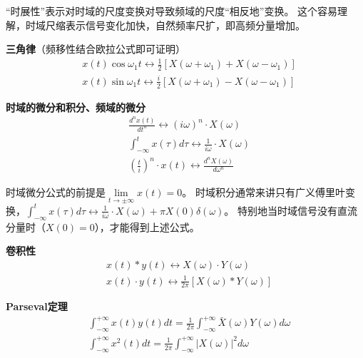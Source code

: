 “时展性”表示对时域的尺度变换对导致频域的尺度“相反地”变换。
这个容易理解，时域尺缩表示信号变化加快，自然频率尺扩，即高频分量增加。

{\bf 三角律}（频移性结合欧拉公式即可证明）
\begin{align*}
&x\left( t \right) \cos \omega _1t\leftrightarrow \frac{1}{2}\left[ X\left( \omega +\omega _1 \right) +X\left( \omega -\omega _1 \right) \right] \\
&x\left( t \right) \sin \omega _1t\leftrightarrow \frac{i}{2}\left[ X\left( \omega +\omega _1 \right) -X\left( \omega -\omega _1 \right) \right]
\end{align*}

{\bf 时域的微分和积分、频域的微分}
\begin{align*}
&\frac{d^nx\left( t \right)}{dt^n}\leftrightarrow \left( i\omega \right) ^n\cdot X\left( \omega \right) \\
&\int_{-\infty}^t{x\left( \tau \right) d\tau}\leftrightarrow \frac{1}{i\omega}\cdot X\left( \omega \right) \\
&\left( \frac{t}{i} \right) ^n\cdot x\left( t \right) \leftrightarrow \frac{d^nX\left( \omega \right)}{d\omega ^n}
\end{align*}

时域微分公式的前提是$\underset{t\rightarrow \pm \infty}{\lim} x\left( t \right) =0$。
时域积分通常来讲只有广义傅里叶变换，$\int_{-\infty}^t{x\left( \tau \right) d\tau}\leftrightarrow \frac{1}{i\omega}\cdot X\left( \omega \right) +\pi X\left( 0 \right) \delta \left( \omega \right) $。
特别地当时域信号没有直流分量时（$X\left( 0 \right) =0$），才能得到上述公式。

{\bf 卷积性}
\begin{align*}
&x\left( t \right) \ast y\left( t \right) \leftrightarrow X\left( \omega \right) \cdot Y\left( \omega \right) \\
&x\left( t \right) \cdot y\left( t \right) \leftrightarrow \frac{1}{2\pi}\left[ X\left( \omega \right) \ast Y\left( \omega \right) \right]
\end{align*}

{\bf Parseval定理}
\begin{align*}
&\int_{-\infty}^{+\infty}{x\left( t \right) y\left( t \right) dt}=\frac{1}{2\pi}\int_{-\infty}^{+\infty}{\bar{X}\left( \omega \right) Y\left( \omega \right) d\omega} \\
&\int_{-\infty}^{+\infty}{x^2\left( t \right) dt}=\frac{1}{2\pi}\int_{-\infty}^{+\infty}{\left| X\left( \omega \right) \right|^2d\omega}
\end{align*}

